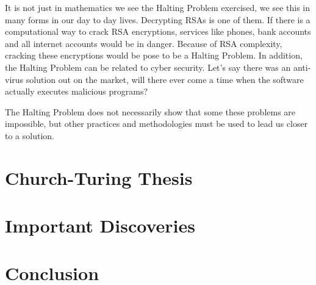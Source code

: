 \documentclass[12pt]{article}
\begin{document}
It is not just in mathematics we see the Halting Problem exercised, we see this in many forms in our day to day lives. Decrypting RSAs is one of them. If there is a computational way to crack RSA encryptions, services like phones, bank accounts and all internet accounts would be in danger. Because of RSA complexity, cracking these encryptions would be pose to be a Halting Problem. In addition, the Halting Problem can be related to cyber security. Let's say there was an anti-virus solution out on the market, will there ever come a time when the software actually executes malicious programs?

The Halting Problem does not necessarily show that some these problems are impossible, but other practices and methodologies must be used to lead us closer to a solution.

\section{Church-Turing Thesis}


\section{Important Discoveries}


\section{Conclusion}
\end{document}
